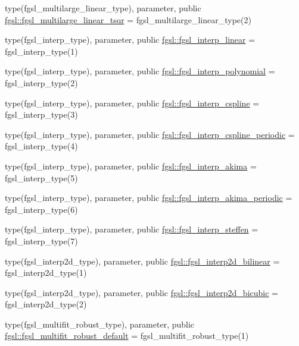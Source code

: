 \begin{DoxyCompactItemize}
\item 
type(fgsl\+\_\+multilarge\+\_\+linear\+\_\+type), parameter, public \hyperlink{namespacefgsl_a15f9b6d29fecabfb8a34b6d5ea69a87b}{fgsl\+::fgsl\+\_\+multilarge\+\_\+linear\+\_\+tsqr} = fgsl\+\_\+multilarge\+\_\+linear\+\_\+type(2)
\item 
type(fgsl\+\_\+interp\+\_\+type), parameter, public \hyperlink{namespacefgsl_a56a303cdb0b7046c3d8bfd1ebbf77bbc}{fgsl\+::fgsl\+\_\+interp\+\_\+linear} = fgsl\+\_\+interp\+\_\+type(1)
\item 
type(fgsl\+\_\+interp\+\_\+type), parameter, public \hyperlink{namespacefgsl_aedbdc4347cb86cafe5bd0a2da8e38648}{fgsl\+::fgsl\+\_\+interp\+\_\+polynomial} = fgsl\+\_\+interp\+\_\+type(2)
\item 
type(fgsl\+\_\+interp\+\_\+type), parameter, public \hyperlink{namespacefgsl_aa03de96a2a37daa1c2e464b98e198eb3}{fgsl\+::fgsl\+\_\+interp\+\_\+cspline} = fgsl\+\_\+interp\+\_\+type(3)
\item 
type(fgsl\+\_\+interp\+\_\+type), parameter, public \hyperlink{namespacefgsl_a383cf4d39acd2faf1d29a204d9349043}{fgsl\+::fgsl\+\_\+interp\+\_\+cspline\+\_\+periodic} = fgsl\+\_\+interp\+\_\+type(4)
\item 
type(fgsl\+\_\+interp\+\_\+type), parameter, public \hyperlink{namespacefgsl_a7da81682e22860ff3f743dcf2e80b6e5}{fgsl\+::fgsl\+\_\+interp\+\_\+akima} = fgsl\+\_\+interp\+\_\+type(5)
\item 
type(fgsl\+\_\+interp\+\_\+type), parameter, public \hyperlink{namespacefgsl_ae51f422b992227f64fb8505b62335502}{fgsl\+::fgsl\+\_\+interp\+\_\+akima\+\_\+periodic} = fgsl\+\_\+interp\+\_\+type(6)
\item 
type(fgsl\+\_\+interp\+\_\+type), parameter, public \hyperlink{namespacefgsl_ae9546a0778cace93ab276425caea840b}{fgsl\+::fgsl\+\_\+interp\+\_\+steffen} = fgsl\+\_\+interp\+\_\+type(7)
\item 
type(fgsl\+\_\+interp2d\+\_\+type), parameter, public \hyperlink{namespacefgsl_aaa41b206c74a9dd325809f55b148d24e}{fgsl\+::fgsl\+\_\+interp2d\+\_\+bilinear} = fgsl\+\_\+interp2d\+\_\+type(1)
\item 
type(fgsl\+\_\+interp2d\+\_\+type), parameter, public \hyperlink{namespacefgsl_ad4d0be659abe19e96011c7a31d8c7e1c}{fgsl\+::fgsl\+\_\+interp2d\+\_\+bicubic} = fgsl\+\_\+interp2d\+\_\+type(2)
\item 
type(fgsl\+\_\+multifit\+\_\+robust\+\_\+type), parameter, public \hyperlink{namespacefgsl_ac1a0aa1e007066fb5ae50fcae0e1c885}{fgsl\+::fgsl\+\_\+multifit\+\_\+robust\+\_\+default} = fgsl\+\_\+multifit\+\_\+robust\+\_\+type(1)

\end{DoxyCompactItemize}
